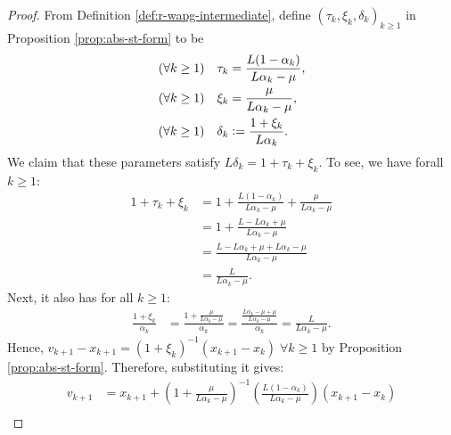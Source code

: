\documentclass[12pt]{article}
\begin{document}
        \begin{proof}
            From Definition \ref{def:r-wapg-intermediate}, define $(\tau_k, \xi_k, \delta_k)_{k \ge 1}$ in Proposition \ref{prop:abs-st-form} to be
            \begin{align*}
                (\forall k \ge 1) \quad \tau_k &= \frac{L(1 - \alpha_k)}{L\alpha_k - \mu},
                \\
                (\forall k \ge 1)\quad 
                \xi_k &= \frac{\mu}{L \alpha_k - \mu},
                \\
                (\forall k \ge 1)\quad 
                \delta_k &\vcentcolon= \frac{1 + \xi_k}{L\alpha_k}. 
            \end{align*}
            We claim that these parameters satisfy $L\delta_k = 1 + \tau_k + \xi_k$. 
            To see, we have forall $k\ge 1$: 
            \begin{align*}
                1 + \tau_k + \xi_k &= 
                1 + \frac{L(1 - \alpha_k)}{L \alpha_k - \mu} 
                + \frac{\mu}{L \alpha_k - \mu}
                \\
                &= 
                1 + \frac{L - L \alpha_k + \mu}{L\alpha_k - \mu}
                \\
                &= 
                \frac{L - L \alpha_k + \mu + L \alpha_k - \mu}{L\alpha_k - \mu}
                \\
                &= \frac{L}{L\alpha_k - \mu}. 
            \end{align*}
            Next, it also has for all $k \ge 1$: 
            \begin{align*}
                \frac{1 + \xi_k}{\alpha_k}
                &= 
                \frac{1 + \frac{\mu}{L\alpha_k - \mu}}{\alpha_k}
                = 
                \frac{\frac{L\alpha_k - \mu + \mu}{L \alpha_k - \mu}}{\alpha_k}
                = 
                \frac{L}{L\alpha_k - \mu}.
            \end{align*}
            Hence,  $v_{k + 1} - x_{k + 1} = (1 + \xi_k)^{-1}(x_{k + 1} - x_k)\; \forall k \ge 1$ by Proposition \ref{prop:abs-st-form}.
            Therefore, substituting it gives: 
            \begin{align*}
                v_{k + 1} &= 
                x_{k + 1} + \left(
                    1 + \frac{\mu}{L\alpha_k - \mu}
                \right)^{-1}\left(
                    \frac{L(1 - \alpha_k)}{L\alpha_k - \mu}
                \right)(x_{k + 1} - x_k)
                \\

\end{align*}
\end{proof}
\end{document}
